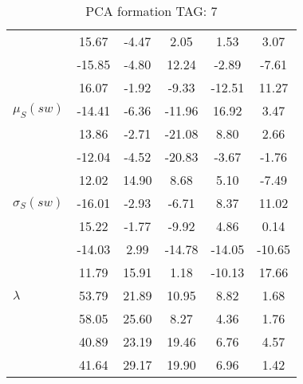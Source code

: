 \begin{table}[h!]
\begin{center}
\begin{tabular}{| l || c | c | c | c | c |}
 & 15.67  & -4.47  & 2.05  & 1.53  & 3.07 \\
 & -15.85  & -4.80  & 12.24  & -2.89  & -7.61 \\
 & 16.07  & -1.92  & -9.33  & -12.51  & 11.27 \\\hline
$\mu_S(sw)$ & -14.41  & -6.36  & -11.96  & 16.92  & 3.47 \\
 & 13.86  & -2.71  & -21.08  & 8.80  & 2.66 \\
 & -12.04  & -4.52  & -20.83  & -3.67  & -1.76 \\
 & 12.02  & 14.90  & 8.68  & 5.10  & -7.49 \\\hline
$\sigma_S(sw)$ & -16.01  & -2.93  & -6.71  & 8.37  & 11.02 \\
 & 15.22  & -1.77  & -9.92  & 4.86  & 0.14 \\
 & -14.03  & 2.99  & -14.78  & -14.05  & -10.65 \\
 & 11.79  & 15.91  & 1.18  & -10.13  & 17.66 \\\hline\hline
$\lambda$ & 53.79  & 21.89  & 10.95  & 8.82  & 1.68 \\
 & 58.05  & 25.60  & 8.27  & 4.36  & 1.76 \\
 & 40.89  & 23.19  & 19.46  & 6.76  & 4.57 \\
 & 41.64  & 29.17  & 19.90  & 6.96  & 1.42 \\\hline
\end{tabular}
\caption{PCA formation TAG: 7}
\end{center}
\end{table}